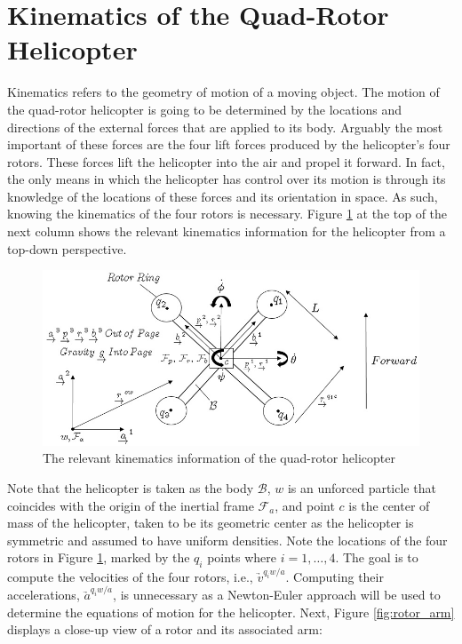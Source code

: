 \documentclass[journal]{IEEEtran}
\begin{document}
\section{Kinematics of the Quad-Rotor Helicopter}
\label{sec:kinematics_section}

Kinematics refers to the geometry of motion of a moving object. The motion of the quad-rotor helicopter is going to be determined by the locations and directions of the external forces that are applied to its body. Arguably the most important of these forces are the four lift forces produced by the helicopter's four rotors. These forces lift the helicopter into the air and propel it forward. In fact, the only means in which the helicopter has control over its motion is through its knowledge of the locations of these forces and its orientation in space. As such, knowing the kinematics of the four rotors is necessary. Figure \ref{fig:top_view} at the top of the next column shows the relevant kinematics information for the helicopter from a top-down perspective.

\begin{figure}[ht]
    \centering
        \includegraphics[width=.50\textwidth]{top_view}
    \caption{The relevant kinematics information of the quad-rotor helicopter}
    \label{fig:top_view}
\end{figure}

Note that the helicopter is taken as the body $\mathcal{B}$, $w$ is an unforced particle that coincides with the origin of the inertial frame $\mathcal{F}_a$, and point $c$ is the center of mass of the helicopter, taken to be its geometric center as the helicopter is symmetric and assumed to have uniform densities. Note the locations of the four rotors in Figure \ref{fig:top_view}, marked by the $q_i$ points where $i=1,\ldots,4$. The goal is to compute the velocities of the four rotors, i.e., $\underrightarrow{v}^{q_iw/a} $. Computing their accelerations, $\underrightarrow{a}^{q_iw/a}$, is unnecessary as a Newton-Euler approach will be used to determine the equations of motion for the helicopter. Next, Figure \ref{fig:rotor_arm} displays a close-up view of a rotor and its associated arm:
\end{document}
